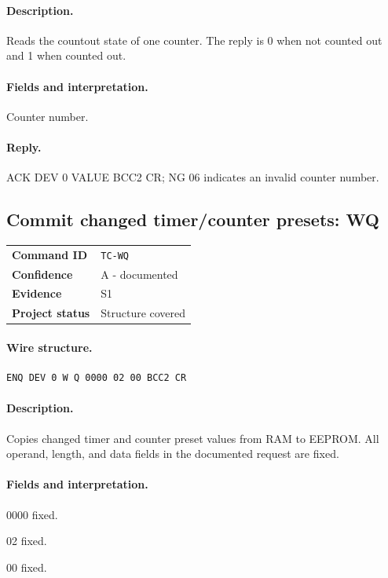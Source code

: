\documentclass[10pt,letterpaper]{article}
\begin{document}
\paragraph{Description.} Reads the countout state of one counter. The reply is 0 when not counted out and 1 when counted out.
\paragraph{Fields and interpretation.}
\begin{description}[style=nextline,leftmargin=3.2cm,labelwidth=3.0cm,font=\normalfont\bfseries]
\item[COUNTER4] Counter number.
\end{description}
\paragraph{Reply.} ACK DEV 0 VALUE BCC2 CR; NG 06 indicates an invalid counter number.

\subsection{Commit changed timer/counter presets: WQ}
\begin{tabularx}{\textwidth}{@{}>{\bfseries}p{2.8cm}X@{}}
Command ID & \texttt{TC-WQ} \\
Confidence & A - documented \\
Evidence & S1 \\
Project status & Structure covered \\
\end{tabularx}
\vspace{0.35em}
\paragraph{Wire structure.}
\begin{Verbatim}[breaklines=true,breakanywhere=true,fontsize=\small]
ENQ DEV 0 W Q 0000 02 00 BCC2 CR
\end{Verbatim}
\paragraph{Description.} Copies changed timer and counter preset values from RAM to EEPROM. All operand, length, and data fields in the documented request are fixed.
\paragraph{Fields and interpretation.}
\begin{description}[style=nextline,leftmargin=3.2cm,labelwidth=3.0cm,font=\normalfont\bfseries]
\item[Operand] 0000 fixed.
\item[Length] 02 fixed.
\item[Data] 00 fixed.
\end{description}
\end{document}
